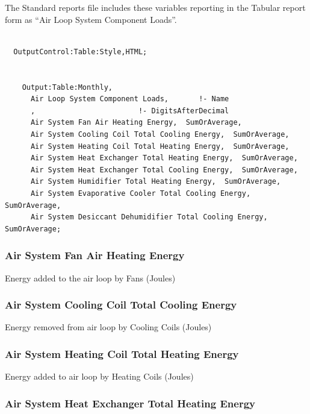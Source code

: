 The Standard reports file includes these variables reporting in the Tabular report form as ``Air Loop System Component Loads''.

\begin{lstlisting}

  OutputControl:Table:Style,HTML;


    Output:Table:Monthly,
      Air Loop System Component Loads,       !- Name
      ,                        !- DigitsAfterDecimal
      Air System Fan Air Heating Energy,  SumOrAverage,
      Air System Cooling Coil Total Cooling Energy,  SumOrAverage,
      Air System Heating Coil Total Heating Energy,  SumOrAverage,
      Air System Heat Exchanger Total Heating Energy,  SumOrAverage,
      Air System Heat Exchanger Total Cooling Energy,  SumOrAverage,
      Air System Humidifier Total Heating Energy,  SumOrAverage,
      Air System Evaporative Cooler Total Cooling Energy,  SumOrAverage,
      Air System Desiccant Dehumidifier Total Cooling Energy,  SumOrAverage;
\end{lstlisting}

\subsubsection{Air System Fan Air Heating Energy}\label{air-system-fan-air-heating-energy}

Energy added to the air loop by Fans (Joules)

\subsubsection{Air System Cooling Coil Total Cooling Energy}\label{air-system-cooling-coil-total-cooling-energy}

Energy removed from air loop by Cooling Coils (Joules)

\subsubsection{Air System Heating Coil Total Heating Energy}\label{air-system-heating-coil-total-heating-energy}

Energy added to air loop by Heating Coils (Joules)

\subsubsection{Air System Heat Exchanger Total Heating Energy}\label{air-system-heat-exchanger-total-heating-energy}

